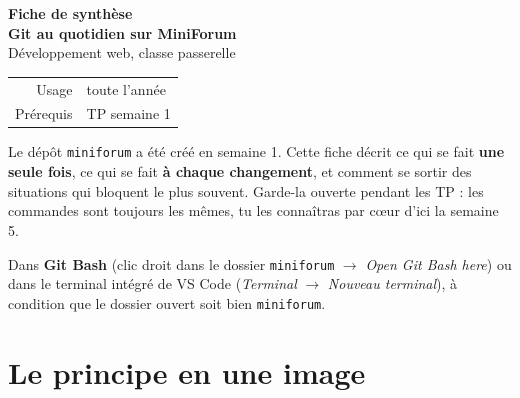 \documentclass[a4paper,11pt]{article}
\begin{document}

\begin{tcolorbox}[
  colback=accentBlue, colframe=accentBlue,
  arc=4pt, left=12pt, right=12pt, top=10pt, bottom=10pt]
  \begin{minipage}{0.66\linewidth}
    {\color{cfptYellow}\Large\bfseries Fiche de synthèse}\\[4pt]
    {\color{white}\Large\bfseries Git au quotidien sur MiniForum}\\[4pt]
    {\color{lightBlue}\normalsize Développement web, classe passerelle}
  \end{minipage}
  \hfill
  \begin{minipage}{0.30\linewidth}
    \raggedleft
    \begin{tabular}{rl}
      \color{lightBlue}\small Usage & \color{white}\small toute l'année \\
      \color{lightBlue}\small Prérequis & \color{white}\small TP semaine 1 \\
    \end{tabular}
  \end{minipage}
\end{tcolorbox}

\vspace{6pt}
\begin{tcolorbox}[definition, title={À quoi sert cette fiche}]
Le dépôt \texttt{miniforum} a été créé en semaine 1. Cette fiche décrit ce qui se fait \textbf{une seule fois}, ce qui se fait \textbf{à chaque changement}, et comment se sortir des situations qui bloquent le plus souvent. Garde-la ouverte pendant les TP : les commandes sont toujours les mêmes, tu les connaîtras par cœur d'ici la semaine 5.
\end{tcolorbox}

\begin{tcolorbox}[astuce, title={Où taper ces commandes}]
Dans \textbf{Git Bash} (clic droit dans le dossier \texttt{miniforum} $\rightarrow$ \textit{Open Git Bash here}) ou dans le terminal intégré de VS Code (\textit{Terminal} $\rightarrow$ \textit{Nouveau terminal}), à condition que le dossier ouvert soit bien \texttt{miniforum}.
\end{tcolorbox}

\section{Le principe en une image}
\end{document}

